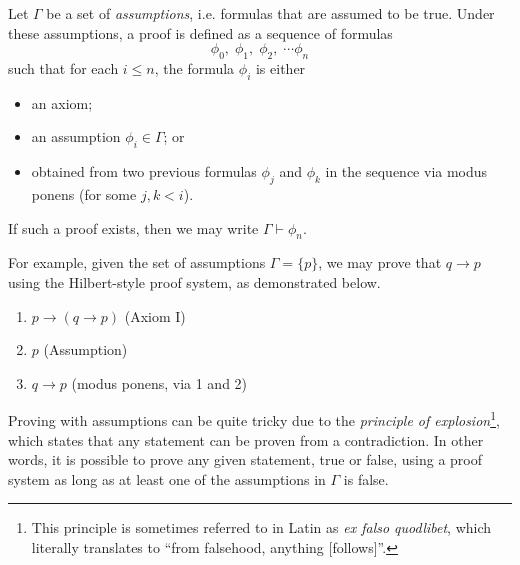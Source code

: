 Let \(\Gamma\) be a set of \emph{assumptions}, i.e. formulas that are assumed to be true. Under these assumptions, a proof is defined as a sequence of formulas
%
\[\phi_0,\; \phi_1,\; \phi_2,\; \cdots \phi_n\]
%
such that for each \(i \leq n\), the formula \(\phi_i\) is either
%
\begin{itemize}
    \item an axiom;
    \item an assumption \(\phi_i \in \Gamma\); or
    \item obtained from two previous formulas \(\phi_j\) and \(\phi_k\) in the sequence via modus ponens (for some \(j, k < i\)).
\end{itemize}
%
If such a proof exists, then we may write \(\Gamma \vdash \phi_n\).

For example, given the set of assumptions \(\Gamma = \{p\}\), we may prove that \(q \rightarrow p\) using the Hilbert-style proof system, as demonstrated below.
%
\begin{enumerate}
    \item \(p \rightarrow (q \rightarrow p)\)
    \hfill (Axiom I)

    \item \(p\)
    \hfill (Assumption)

    \item \(q \rightarrow p\)
    \hfill (modus ponens, via 1 and 2)
\end{enumerate}


Proving with assumptions can be quite tricky due to the \emph{principle of explosion}\footnote{This principle is sometimes referred to in Latin as \textit{ex falso quodlibet}, which literally translates to ``from falsehood, anything [follows]''.}, which states that any statement can be proven from a contradiction. In other words, it is possible to prove any given statement, true or false, using a proof system as long as at least one of the assumptions in \(\Gamma\) is false.

